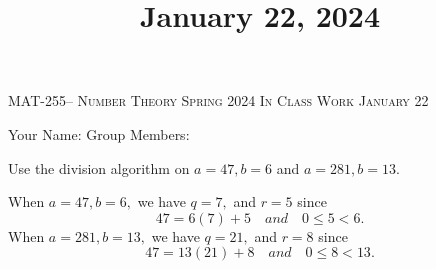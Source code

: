 \documentclass[handout]{ximera}
\title{January 22, 2024}
\begin{document}
\handoutAbstract
\maketitle
    \begin{center}%
            {\large \scshape MAT-255-- Number Theory \hfill Spring 2024 \hfill In Class Work January 22}%
        
        {\large
            Your Name: \hrulefill \quad Group Members:\hrulefill \quad \hrulefill
	    \par}%
    \end{center}%

\begin{br} 
    Use the division algorithm on $a=47, b=6$ and $a=281, b=13$.
    \begin{solution}
        When $a=47, b=6,$ we have $q=7,$ and $r=5$ since \[47=6(7)+5\quad and \quad 0\leq 5 <6.\]
        When $a=281, b=13,$ we have $q=21,$ and $r=8$ since \[47=13(21)+8\quad and \quad 0\leq 8 <13.\]
    \end{solution}
    \pdfOnly{\ifhandout{
        \vfill}
        \else
        \fi}
\end{br}
\end{document}
